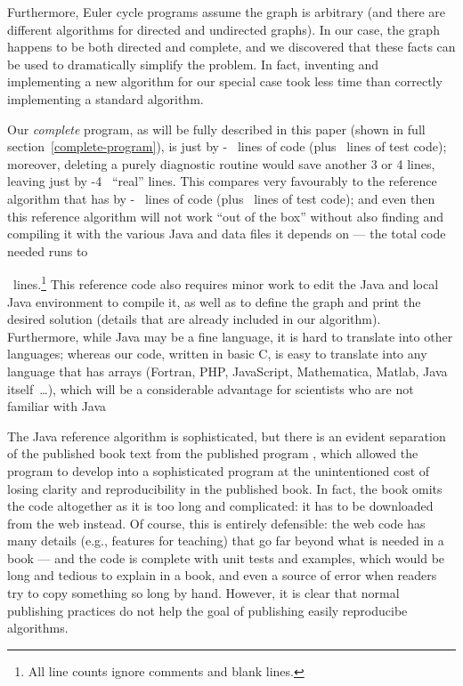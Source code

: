 \documentclass[12pt]{article}
\begin{document}
Furthermore, Euler cycle programs assume the graph is arbitrary (and there are different algorithms for directed and undirected graphs). In our case, the graph happens to be both directed and complete, and we discovered that these facts can be used to dramatically simplify the problem. In fact, inventing and implementing a new algorithm for our special case took less time than correctly implementing a standard algorithm. 

Our \emph{complete\/} program, as will be fully described in this paper (shown in full section~\ref{complete-program}), is just 
\newcount\testcode 
{} \advance\linesofcode by -\testcode
\the\linesofcode\ lines of code  (plus \the\testcode\ lines of test code); moreover, deleting a purely diagnostic routine would save another 3 or 4 lines, leaving just
\advance \linesofcode by -4 \the\linesofcode\ ``real'' lines. This compares very favourably to the reference algorithm \cite{sedgewickcode} that has 
 \advance\linesofcode by -\testcode
\the\linesofcode\ lines of code (plus \the\testcode\ lines of test code); and even then this reference algorithm will not work ``out of the box'' without also finding  and compiling it  with the various Java and data files it depends on --- the total code needed runs to   

\the\linesofcode\ lines.\footnote{All line counts ignore comments and blank lines.} This reference code also requires minor work to edit the Java and local Java environment to compile it, as well as to define the graph and print the desired solution (details that are already included in our algorithm). Furthermore, while Java may be a fine language, it is hard to translate into other languages; whereas our code, written in basic C, is easy to translate into any language that has arrays (Fortran, PHP, JavaScript, Mathematica, Matlab, Java itself~\ldots), which will be a considerable advantage for scientists who are not familiar with Java

The Java reference algorithm is sophisticated, but there is an evident separation of the published book text \cite{sedgewickbook} from the published program \cite{sedgewickcode}, which allowed the program to develop into a sophisticated program at the unintentioned cost of losing clarity and reproducibility in the published book. In fact, the book \cite{sedgewickcode} omits the code altogether as it is too long and complicated: it has to be downloaded from the web instead. Of course, this is entirely defensible: the web code has many details (e.g., features for teaching) that go far beyond what is needed in a book --- and the code is complete with unit tests and examples, which would be long and tedious to explain in a book, and even a source of error when readers try to copy something so long by hand. However, it is clear that normal publishing practices do not help the goal of publishing easily reproducibe algorithms. 
\end{document}
